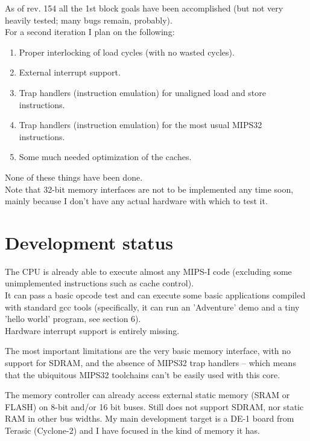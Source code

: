     As of rev. 154 all the 1st block goals have been accomplished (but not very
    heavily tested; many bugs remain, probably).\\
    
    For a second iteration I plan on the following:
\begin{enumerate}
    \item Proper interlocking of load cycles (with no wasted cycles).
    \item External interrupt support.
    \item Trap handlers (instruction emulation) for unaligned load and store 
        instructions.
    \item Trap handlers (instruction emulation) for the most usual MIPS32 
        instructions.
    \item Some much needed optimization of the caches.
\end{enumerate}
    None of these things have been done.\\

    
    Note that 32-bit memory interfaces are not to be implemented any time soon, 
    mainly because I don't have any actual hardware with which to test it.
    

\section{Development status}
\label{status}

    The CPU is already able to execute almost any MIPS-I code (excluding some
    unimplemented instructions such as cache control).\\
    It can pass a basic opcode test and can execute some basic applications 
    compiled with standard gcc tools (specifically, it can run an 'Adventure' 
    demo and a tiny 'hello world' program, see section 6).\\
    
    Hardware interrupt support is entirely missing.
    
    The most important limitations are the very basic memory interface, with
    no support for SDRAM, and the absence of MIPS32 trap handlers -- which 
    means that the ubiquitous MIPS32 toolchains can't be easily used with 
    this core.
    
    The memory controller can already access external static memory (SRAM or 
    FLASH) on 8-bit and/or 16 bit buses. Still does not support SDRAM, nor 
    static RAM in other bus widths.
    My main development target is a DE-1 board from Terasic (Cyclone-2) and I 
    have focused in the kind of memory it has.
    

